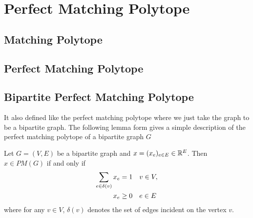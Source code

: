 \chapter{Perfect Matching Polytope}
\section{Matching Polytope}
\section{Perfect Matching Polytope}
\section{Bipartite Perfect Matching Polytope}
It also defined like the perfect matching polytope where we just take the graph to be a bipartite graph. The following lemma form \cite{LovaszPlummer_1986_BOOK} gives a simple description of the perfect matching polytope of a bipartite graph $G$ 
\begin{lemma}{\cite{LovaszPlummer_1986_BOOK}}{}
	Let $G=(V,E)$ be a bipartite graph and $x=(x_e)_{e\in E}\in \mathbb{R}^E$. Then $x\in PM(G)$ if and only if \begin{align*}
		\sum_{e\in\delta(v)}x_e=1 &\quad v\in V,\\
		x_e\geq 0&\quad e\in E
	\end{align*}where for any $v\in V$, $\delta(v)$ denotes the set of edges incident on the vertex $v$.
\end{lemma}

